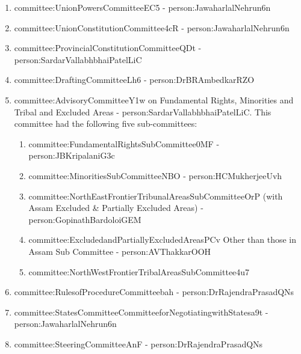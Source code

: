 \begin{enumerate}
  \item \gls{committee:UnionPowersCommitteeEC5} - \gls{person:JawaharlalNehrun6n}
  \item \gls{committee:UnionConstitutionCommittee4cR} - \gls{person:JawaharlalNehrun6n}
  \item \gls{committee:ProvincialConstitutionCommitteeQDt} - \gls{person:SardarVallabhbhaiPatelLiC}
  \item \gls{committee:DraftingCommitteeLh6} - \gls{person:DrBRAmbedkarRZO}
  \item \gls{committee:AdvisoryCommitteeY1w} on Fundamental Rights, Minorities and Tribal and Excluded Areas - \gls{person:SardarVallabhbhaiPatelLiC}. This committee had the following five sub-committees:
  \begin{enumerate}
    \item \gls{committee:FundamentalRightsSubCommittee0MF} - \gls{person:JBKripalaniG3c}
    \item \gls{committee:MinoritiesSubCommitteeNBO} - \gls{person:HCMukherjeeUvh}
    \item \gls{committee:NorthEastFrontierTribunalAreasSubCommitteeOrP} (with Assam Excluded \& Partially Excluded Areas) - \gls{person:GopinathBardoloiGEM}
    \item \gls{committee:ExcludedandPartiallyExcludedAreasPCv} Other than those in Assam Sub Committee - \gls{person:AVThakkarOOH}
    \item \gls{committee:NorthWestFrontierTribalAreasSubCommittee4u7}
  \end{enumerate}
  
  \item \gls{committee:RulesofProcedureCommitteebah} - \gls{person:DrRajendraPrasadQNs}
  \item \gls{committee:StatesCommitteeCommitteeforNegotiatingwithStatesa9t} - \gls{person:JawaharlalNehrun6n}
  \item \gls{committee:SteeringCommitteeAnF} - \gls{person:DrRajendraPrasadQNs}
\end{enumerate}

